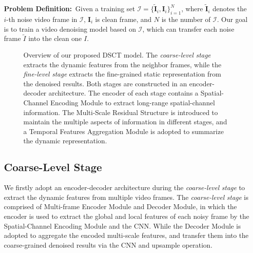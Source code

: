 \documentclass[journal]{IEEEtran}
\begin{document}
\noindent\textbf{Problem Definition:}~Given a training set $\mathcal{I} = \{\tilde{\mathbf{I}}_i, \mathbf{I}_i\}_{i=1}^{N}$, where $\tilde{\mathbf{I}}_i$ denotes the $i$-th noise video frame in $\mathcal{I}$, $\mathbf{I}_i$ is clean frame, and $N$ is the number of $\mathcal{I}$. Our goal is to train a video denoising model based on $\mathcal{I}$, which can transfer each noise frame $\tilde{I}$ into the clean one $I$. 

\begin{figure*}[htbp]
\begin{center}
\setlength{\fboxrule}{0pt}
\setlength{\fboxsep}{0cm}
\end{center}
\vspace{-0.5mm}
\caption{Overview of our proposed DSCT model. The \emph{coarse-level stage} extracts the dynamic features from the neighbor frames, while the \emph{fine-level stage} extracts the fine-grained static representation from the denoised results. Both stages are constructed in an encoder-decoder architecture. The encoder of each stage contains a Spatial-Channel Encoding Module to extract long-range spatial-channel information. The Multi-Scale Residual Structure is introduced to maintain the multiple aspects of information in different stages, and a Temporal Features Aggregation Module is adopted to summarize the dynamic representation.
}
\label{fig:2}
\end{figure*}



\subsection{Coarse-Level Stage}

We firstly adopt an encoder-decoder architecture during the \emph{coarse-level stage} to extract the dynamic features from multiple video frames. The \emph{coarse-level stage} is comprised of Multi-frame Encoder Module and Decoder Module, in which the encoder is used to extract the global and local features of each noisy frame by the Spatial-Channel Encoding Module and the CNN. While the Decoder Module is adopted to aggregate the encoded multi-scale features, and transfer them into the coarse-grained denoised results via the CNN and upsample operation. 
\end{document}
